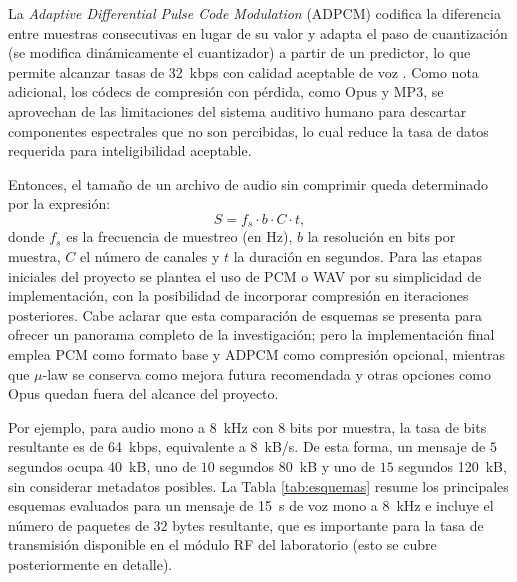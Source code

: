 La \textit{Adaptive Differential Pulse Code Modulation} (ADPCM) codifica la diferencia entre muestras consecutivas en lugar de su valor y adapta el paso de cuantización (se modifica dinámicamente el cuantizador) a partir de un predictor, lo que permite alcanzar tasas de \SI{32}{\kilo bps} con calidad aceptable de voz \cite{pohlmann2005, li2014}.
Como nota adicional, los códecs de compresión con pérdida, como Opus y MP3, se aprovechan de las limitaciones del sistema auditivo humano para descartar componentes espectrales que no son percibidas, lo cual reduce la tasa de datos requerida para inteligibilidad aceptable.

Entonces, el tamaño de un archivo de audio sin comprimir queda determinado por la expresión:
\begin{equation}
    S = f_s \cdot b \cdot C \cdot t,
\end{equation}
donde $f_s$ es la frecuencia de muestreo (en \si{\hertz}), $b$ la resolución en bits por muestra, $C$ el número de canales y $t$ la duración en segundos.
Para las etapas iniciales del proyecto se plantea el uso de PCM o WAV por su simplicidad de implementación, con la posibilidad de incorporar compresión en iteraciones posteriores.
Cabe aclarar que esta comparación de esquemas se presenta para ofrecer un panorama completo de la investigación; pero la implementación final emplea PCM como formato base y ADPCM como compresión opcional, mientras que $\mu$-law se conserva como mejora futura recomendada y otras opciones como Opus quedan fuera del alcance del proyecto.

Por ejemplo, para audio mono a \SI{8}{\kilo\hertz} con $8$ bits por muestra, la tasa de bits resultante es de \SI{64}{kbps}, equivalente a \SI{8}{kB/s}.
De esta forma, un mensaje de $5$ segundos ocupa \SI{40}{kB}, uno de $10$ segundos \SI{80}{kB} y uno de $15$ segundos \SI{120}{kB}, sin considerar metadatos posibles.
La Tabla \ref{tab:esquemas} resume los principales esquemas evaluados para un mensaje de \SI{15}{\second} de voz mono a \SI{8}{\kilo\hertz} e incluye el número de paquetes de $32$ bytes resultante, que es importante para la tasa de transmisión disponible en el módulo RF del laboratorio (esto se cubre posteriormente en detalle).

